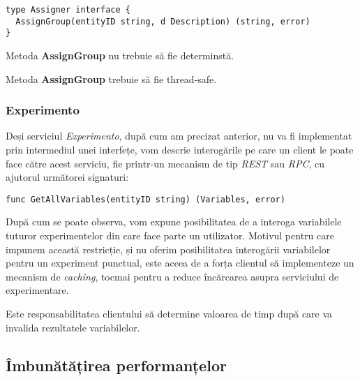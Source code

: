 \begin{center}
	\begin{lstlisting}[language=Golang]
type Assigner interface {
  AssignGroup(entityID string, d Description) (string, error)
}
	\end{lstlisting}
\end{center}

\begin{remark}
	Metoda \textbf{AssignGroup} nu trebuie să fie determinstă.
\end{remark}

\begin{remark}
	Metoda \textbf{AssignGroup} trebuie să fie thread-safe.
\end{remark}

\subsubsection{Experimento}

Deși serviciul \textit{Experimento}, după cum am precizat anterior, nu va fi implementat prin intermediul unei interfețe, vom descrie interogările pe care un client le poate face către acest serviciu, fie printr-un mecanism de tip \textit{REST} sau \textit{RPC}, cu ajutorul următorei signaturi:

\begin{center}
	\begin{lstlisting}[language=Golang]
func GetAllVariables(entityID string) (Variables, error)
	\end{lstlisting}
\end{center}

După cum se poate observa, vom expune posibilitatea de a interoga variabilele tuturor experimentelor din care face parte un utilizator. Motivul pentru care impunem această restricție, și nu oferim posibilitatea interogării variabilelor pentru un experiment punctual, este aceea de a forța clientul să implementeze un mecanism de \textit{caching}, tocmai pentru a reduce încărcarea asupra serviciului de experimentare.

\begin{remark}
	Este responsabilitatea clientului să determine valoarea de timp după care va invalida rezultatele variabilelor.
\end{remark}

\subsection{Îmbunătățirea performanțelor}

